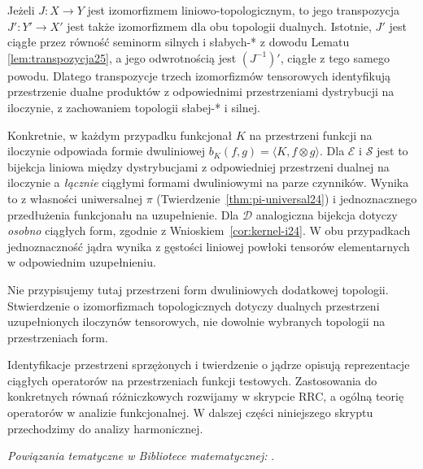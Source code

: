 \begin{uwaga}
\label{rem:kernel-summary25}
Jeżeli $J:X\to Y$ jest izomorfizmem liniowo-topologicznym,
to jego transpozycja $J':Y'\to X'$ jest także
izomorfizmem dla obu topologii dualnych.
Istotnie, $J'$ jest ciągłe przez równość seminorm
silnych i słabych-* z dowodu Lematu~
\ref{lem:transpozycja25}, a jego odwrotnością jest
$(J^{-1})'$, ciągłe z tego samego powodu.
Dlatego transpozycje trzech izomorfizmów tensorowych
identyfikują przestrzenie dualne produktów
z odpowiednimi przestrzeniami dystrybucji na
iloczynie, z zachowaniem topologii słabej-* i silnej.

Konkretnie, w każdym przypadku funkcjonał $K$
na przestrzeni funkcji na iloczynie odpowiada
formie dwuliniowej
$b_K(f,g)=\langle K,f\otimes g\rangle$.
Dla $\mathcal E$ i $\mathcal S$ jest to bijekcja
liniowa między dystrybucjami z odpowiedniej
przestrzeni dualnej na iloczynie a \emph{łącznie}
ciągłymi formami dwuliniowymi na parze czynników.
Wynika to z własności uniwersalnej $\pi$
(Twierdzenie~\ref{thm:pi-universal24}) i jednoznacznego
przedłużenia funkcjonału na uzupełnienie.
Dla $\mathcal D$ analogiczna bijekcja dotyczy
\emph{osobno} ciągłych form, zgodnie z
Wnioskiem~\ref{cor:kernel-i24}.
W obu przypadkach jednoznaczność jądra wynika
z gęstości liniowej powłoki tensorów elementarnych
w odpowiednim uzupełnieniu.

Nie przypisujemy tutaj przestrzeni form dwuliniowych
dodatkowej topologii. Stwierdzenie o izomorfizmach
topologicznych dotyczy dualnych przestrzeni
uzupełnionych iloczynów tensorowych, nie dowolnie
wybranych topologii na przestrzeniach form.
\end{uwaga}

\begin{uwaga}
\label{rem:future25}
Identyfikacje przestrzeni sprzężonych i twierdzenie o jądrze
opisują reprezentacje ciągłych operatorów na przestrzeniach
funkcji testowych. Zastosowania do konkretnych równań
różniczkowych rozwijamy w skrypcie RRC, a ogólną teorię
operatorów w analizie funkcjonalnej. W dalszej części
niniejszego skryptu przechodzimy do analizy harmonicznej.
\end{uwaga}

\noindent\emph{Powiązania tematyczne w Bibliotece matematycznej:} .
